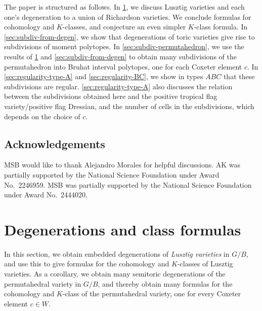 \documentclass[11pt]{amsart}
\theoremstyle{definition}
\begin{document}
The paper is structured as follows. In \cref{sec:degen-and-class-formulas}, we discuss Lusztig varieties and each one's degeneration to a union of Richardson varieties. We conclude formulas for cohomology and $K$-classes, and conjecture an even simpler $K$-class formula. In \cref{sec:subdiv-from-degen}, we show that degenerations of toric varieties give rise to subdivisions of moment polytopes. In \cref{sec:subdiv-permutahedron}, we use the results of \cref{sec:degen-and-class-formulas} and \cref{sec:subdiv-from-degen} to obtain many subdivisions of the permutahedron into Bruhat interval polytopes, one for each Coxeter element $c$. In \cref{sec:regularity-type-A} and \cref{sec:regularity-BC}, we show in types $ABC$ that these subdivisions are regular. \cref{sec:regularity-type-A} also discusses the relation between the subdivisions obtained here and the positive tropical flag variety/positive flag Dressian, and the number of cells in the subdivisions, which depends on the choice of $c$.





  \subsection{Acknowledgements} MSB would like to thank Alejandro Morales for helpful discussions.
  AK was partially supported by the National Science Foundation under
  Award No.~2246959.
  MSB was partially supported by the National Science Foundation under
  Award No.~2444020.


\section{Degenerations and class formulas} \label{sec:degen-and-class-formulas}




In this section, we obtain embedded degenerations of \emph{Lusztig varieties}
in $G/B$, and use this to give formulas for the cohomology and
$K$-classes of Lusztig varieties. As a corollary, we obtain many
semitoric degenerations of the permutahedral variety in $G/B$, and thereby
obtain many formulas for the cohomology and $K$-class of the
permutahedral variety, one for every Coxeter element $c \in W$.
\end{document}

